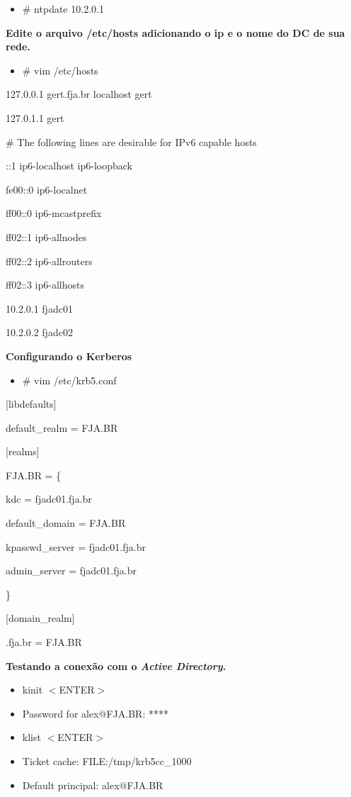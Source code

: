 \begin{itemize}
	\item {\# ntpdate 10.2.0.1}
\end{itemize}

\textbf{Edite o arquivo /etc/hosts adicionando o ip e o nome do DC de sua rede.}

\begin{itemize}
	\item {\# vim /etc/hosts}
\end{itemize}

127.0.0.1       gert.fja.br localhost gert

127.0.1.1       gert

\# The following lines are desirable for IPv6 capable hosts

::1     ip6-localhost ip6-loopback

fe00::0 ip6-localnet

ff00::0 ip6-mcastprefix

ff02::1 ip6-allnodes

ff02::2 ip6-allrouters

ff02::3 ip6-allhosts

10.2.0.1   fjadc01

10.2.0.2   fjadc02

\textbf{Configurando o Kerberos}

\begin{itemize}
	\item {\# vim /etc/krb5.conf}
\end{itemize}

[libdefaults]

	default\_realm = FJA.BR

[realms]

    FJA.BR = \{

      kdc = fjadc01.fja.br

      default\_domain = FJA.BR

      kpasswd\_server = fjadc01.fja.br

      admin\_server = fjadc01.fja.br

     \}

[domain\_realm]

.fja.br = FJA.BR

\textbf {Testando a conexão com o \textit{Active Directory}.}

\begin{itemize}
	\item {kinit $<$ENTER$>$}
	\item {Password for alex$@$FJA.BR: ****}
	\item {klist $<$ENTER$>$}
	\item {Ticket cache: FILE:/tmp/krb5cc\_1000}
	\item {Default principal: alex$@$FJA.BR}
\end{itemize}

